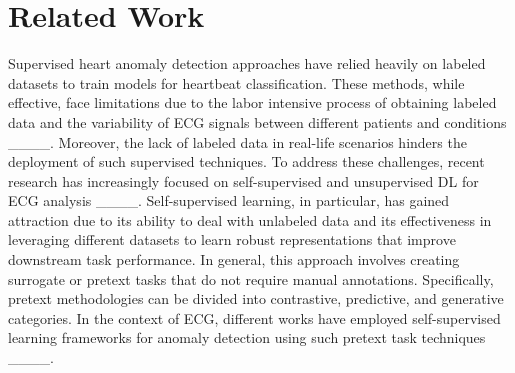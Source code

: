 \section{Related Work}
\label{related}

Supervised heart anomaly detection approaches have relied heavily on labeled datasets to train models for heartbeat classification. These methods, while effective, face limitations due to the labor intensive process of obtaining labeled data and the variability of ECG signals between different patients and conditions ____. Moreover, the lack of labeled data in real-life scenarios hinders the deployment of such supervised techniques. To address these challenges, recent research has increasingly focused on self-supervised and unsupervised DL for ECG analysis ____. Self-supervised learning, in particular, has gained attraction due to its ability to deal with unlabeled data and its effectiveness in leveraging different datasets to learn robust representations that improve downstream task performance. In general, this approach involves creating surrogate or pretext tasks that do not require manual annotations. Specifically, pretext methodologies can be divided into contrastive, predictive, and generative categories. In the context of ECG, different works have employed self-supervised learning frameworks for anomaly detection using such pretext task techniques ____. 

